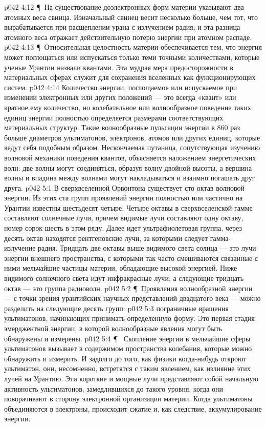 \vs p042 4:12 \P\ На существование доэлектронных форм материи указывают два атомных веса свинца. Изначальный свинец весит несколько больше, чем тот, что вырабатывается при расщеплении урана с излучением радия; и эта разница атомного веса отражает действительную потерю энергии при атомном распаде.
\vs p042 4:13 \P\ Относительная целостность материи обеспечивается тем, что энергия может поглощаться или испускаться только теми точными количествами, которые ученые Урантии назвали квантами. Эта мудрая мера предосторожности в материальных сферах служит для сохранения вселенных как функционирующих систем.
\vs p042 4:14 Количество энергии, поглощаемое или испускаемое при изменении электронных или других положений --- это всегда «квант» или кратное ему количество, но колебательное или волнообразное поведение таких единиц энергии полностью определяется размерами соответствующих материальных структур. Такие волнообразные пульсации энергии в 860 раз больше диаметров ультиматонов, электронов, атомов или других единиц, которые ведут себя подобным образом. Нескончаемая путаница, сопутствующая изучению волновой механики поведения квантов, объясняется наложением энергетических волн: две волны могут соединяться, образуя волну двойной высоты, а вершина волны и впадина между волнами могут накладываться и взаимно погашать друг друга.
\vs p042 5:1 В сверхвселенной Орвонтона существует сто октав волновой энергии. Из этих ста групп проявлений энергии полностью или частично на Урантии известны шестьдесят четыре. Четыре октавы в сверхвселенской гамме составляют солнечные лучи, причем видимые лучи составляют одну октаву, номер сорок шесть в этом ряду. Далее идет ультрафиолетовая группа, через десять октав находятся рентгеновские лучи, за которыми следует гамма\hyp{}излучение радия. Тридцать две октавы выше видимого света солнца --- это лучи энергии внешнего пространства, с которыми так часто смешиваются связанные с ними мельчайшие частицы материи, обладающие высокой энергией. Ниже видимого солнечного света идут инфракрасные лучи, а следующие тридцать октав --- это группа радиоволн.
\vs p042 5:2 \P\ Проявления волнообразной энергии --- с точки зрения урантийских научных представлений двадцатого века --- можно разделить на следующие десять групп:
\vs p042 5:3 \bibnobreakspace {} пограничные вращения ультиматонов, начинающих принимать определенную форму. Это первая стадия эмерджентной энергии, в которой волнообразные явления могут быть обнаружены и измерены.
\vs p042 5:4 \P\ \bibnobreakspace {} Скопление энергии в мельчайшие сферы ультиматонов вызывает в содержимом пространства колебания, которые можно обнаружить и измерить. И задолго до того, как физики когда\hyp{}нибудь откроют ультиматон, они, несомненно, встретятся с таким явлением, как излияние этих лучей на Урантию. Эти короткие и мощные лучи представляют собой начальную активность ультиматонов, замедлившихся до такого уровня, когда они поворачивают в сторону электронной организации материи. Когда ультиматоны объединяются в электроны, происходит сжатие и, как следствие, аккумулирование энергии.
